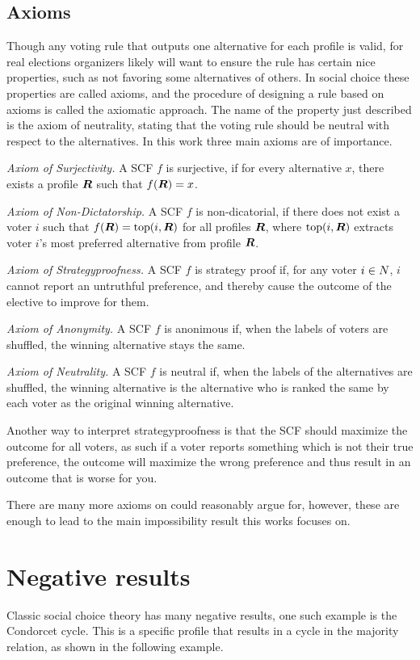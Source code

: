 \subsection{Axioms}
Though any voting rule that outputs one alternative for each profile is valid, for real elections organizers likely will want to ensure the rule has certain nice properties, such as not favoring some alternatives of others. In social choice these properties are called axioms, and the procedure of designing a rule based on axioms is called the axiomatic approach. The name of the property just described is the axiom of neutrality, stating that the voting rule should be neutral with respect to the alternatives. In this work three main axioms are of importance.

\emph{Axiom of Surjectivity.} A SCF $f$ is surjective, if for every alternative
$x$, there exists a profile $\boldsymbol{R}$ such that
$f(\boldsymbol{R}) = x$.

\emph{Axiom of Non-Dictatorship.} A SCF $f$ is non-dicatorial, if there does not exist a voter $i$ such that $f(\boldsymbol{R}) = \textnormal{top}(i,\boldsymbol{R})$ for all profiles $\boldsymbol{R}$, where $\textnormal{top}(i,\boldsymbol{R})$  extracts voter $i$'s most preferred alternative from profile $\boldsymbol{R}$.

\emph{Axiom of Strategyproofness.} A SCF $f$ is strategy proof if, for any voter $i \in N$, $i$ cannot report an untruthful preference, and thereby cause the outcome of the elective to improve for them.

\emph{Axiom of Anonymity.} A SCF $f$ is anonimous if, when the labels of voters are shuffled, the winning alternative stays the same.

\emph{Axiom of Neutrality.} A SCF $f$ is neutral if, when the labels of the alternatives are shuffled, the winning alternative is the alternative who is ranked the same by each voter as the original winning alternative.

Another way to interpret strategyproofness is that the SCF should maximize the outcome for all voters, as such  if a voter reports something which is not their true preference, the outcome will maximize the wrong preference and thus result in an outcome that is worse for you.

There are many more axioms on could reasonably argue for, however, these are enough to lead to the main impossibility result this works focuses on.

\section{Negative results}
Classic social choice theory has many negative results, one such example is the Condorcet cycle. This is a specific profile that results in a cycle in the majority relation, as shown in the following example.

